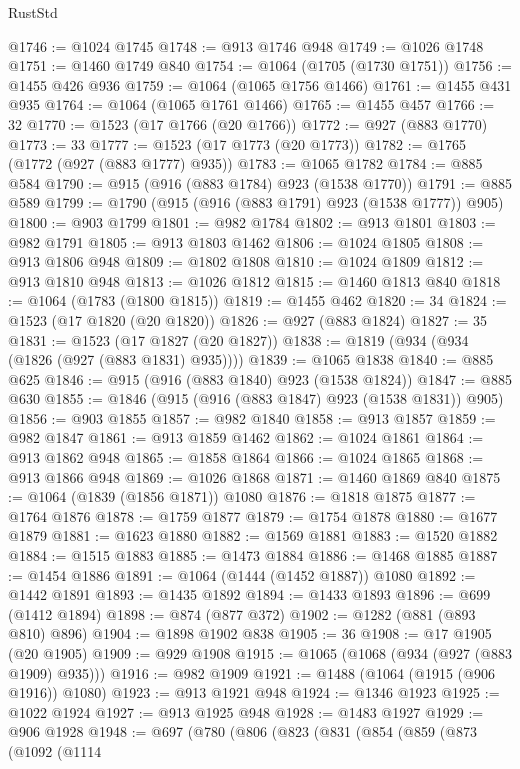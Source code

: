 \begin{lexlean}{RustStd}
\begin{coremodule}
@1746 := @1024 @1745
@1748 := @913 @1746 @948
@1749 := @1026 @1748
@1751 := @1460 @1749 @840
@1754 := @1064 (@1705 (@1730 @1751))
@1756 := @1455 @426 @936
@1759 := @1064 (@1065 @1756 @1466)
@1761 := @1455 @431 @935
@1764 := @1064 (@1065 @1761 @1466)
@1765 := @1455 @457
@1766 := 32
@1770 := @1523 (@17 @1766 (@20 @1766))
@1772 := @927 (@883 @1770)
@1773 := 33
@1777 := @1523 (@17 @1773 (@20 @1773))
@1782 := @1765 (@1772 (@927 (@883 @1777) @935))
@1783 := @1065 @1782
@1784 := @885 @584
@1790 := @915 (@916 (@883 @1784) @923 (@1538 @1770))
@1791 := @885 @589
@1799 := @1790 (@915 (@916 (@883 @1791) @923 (@1538 @1777)) @905)
@1800 := @903 @1799
@1801 := @982 @1784
@1802 := @913 @1801
@1803 := @982 @1791
@1805 := @913 @1803 @1462
@1806 := @1024 @1805
@1808 := @913 @1806 @948
@1809 := @1802 @1808
@1810 := @1024 @1809
@1812 := @913 @1810 @948
@1813 := @1026 @1812
@1815 := @1460 @1813 @840
@1818 := @1064 (@1783 (@1800 @1815))
@1819 := @1455 @462
@1820 := 34
@1824 := @1523 (@17 @1820 (@20 @1820))
@1826 := @927 (@883 @1824)
@1827 := 35
@1831 := @1523 (@17 @1827 (@20 @1827))
@1838 := @1819 (@934 (@934 (@1826 (@927 (@883 @1831) @935))))
@1839 := @1065 @1838
@1840 := @885 @625
@1846 := @915 (@916 (@883 @1840) @923 (@1538 @1824))
@1847 := @885 @630
@1855 := @1846 (@915 (@916 (@883 @1847) @923 (@1538 @1831)) @905)
@1856 := @903 @1855
@1857 := @982 @1840
@1858 := @913 @1857
@1859 := @982 @1847
@1861 := @913 @1859 @1462
@1862 := @1024 @1861
@1864 := @913 @1862 @948
@1865 := @1858 @1864
@1866 := @1024 @1865
@1868 := @913 @1866 @948
@1869 := @1026 @1868
@1871 := @1460 @1869 @840
@1875 := @1064 (@1839 (@1856 @1871)) @1080
@1876 := @1818 @1875
@1877 := @1764 @1876
@1878 := @1759 @1877
@1879 := @1754 @1878
@1880 := @1677 @1879
@1881 := @1623 @1880
@1882 := @1569 @1881
@1883 := @1520 @1882
@1884 := @1515 @1883
@1885 := @1473 @1884
@1886 := @1468 @1885
@1887 := @1454 @1886
@1891 := @1064 (@1444 (@1452 @1887)) @1080
@1892 := @1442 @1891
@1893 := @1435 @1892
@1894 := @1433 @1893
@1896 := @699 (@1412 @1894)
@1898 := @874 (@877 @372)
@1902 := @1282 (@881 (@893 @810) @896)
@1904 := @1898 @1902 @838
@1905 := 36
@1908 := @17 @1905 (@20 @1905)
@1909 := @929 @1908
@1915 := @1065 (@1068 (@934 (@927 (@883 @1909) @935)))
@1916 := @982 @1909
@1921 := @1488 (@1064 (@1915 (@906 @1916)) @1080)
@1923 := @913 @1921 @948
@1924 := @1346 @1923
@1925 := @1022 @1924
@1927 := @913 @1925 @948
@1928 := @1483 @1927
@1929 := @906 @1928
@1948 := @697
    (@780
      (@806
        (@823
          (@831
            (@854
              (@859
                (@873
                  (@1092
                    (@1114

\end{coremodule}
\end{lexlean}
